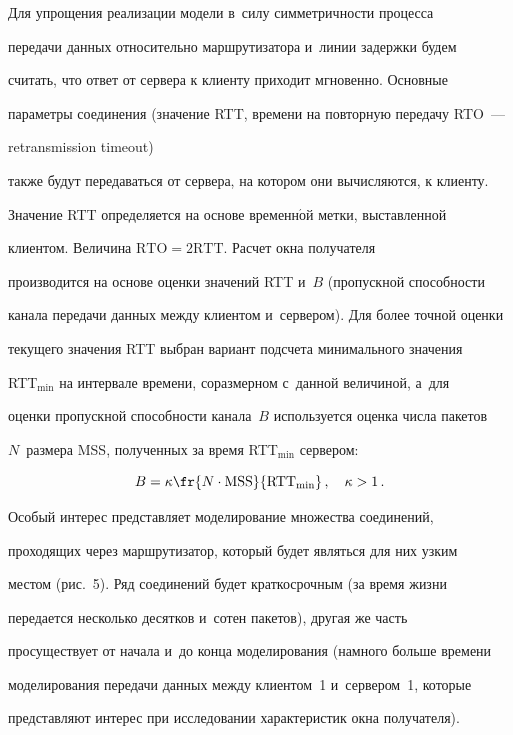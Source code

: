   Для упрощения реализации модели в~силу симметричности процесса


передачи данных относительно маршрутизатора и~линии задержки будем


считать, что ответ от сервера к клиенту приходит мгновенно. Основные


параметры соединения (значение RTT, времени на повторную передачу RTO~---


retransmission timeout)


также будут передаваться от сервера, на котором они вычисляются, к клиенту.


Значение RTT определяется на основе временн$\acute{\mbox{о}}$й метки, выставленной


клиентом. Величина $\mathrm{RTO} = 2 \mathrm{RTT}$. Расчет окна получателя


производится на основе оценки значений RTT и~$B$ (пропускной способности


канала передачи данных между клиентом и~сервером). Для более точной оценки


текущего значения RTT выбран вариант подсчета минимального значения


RTT$_{\min}$ на интервале времени, соразмерном с~данной величиной, а~для


оценки пропускной способности канала~$B$ используется оценка числа пакетов


$N$~размера MSS, полученных за время RTT$_{\min}$ сервером:


  $$


  B=\kappa\fr{N \cdot \mathrm{MSS}}{\mathrm{RTT}_{\min}}\,,\quad \kappa>1\,.


  $$





  Особый интерес представляет моделирование множества соединений,


проходящих через маршрутизатор, который будет являться для них узким


местом (рис.~5). Ряд соединений будет краткосрочным (за время жизни


передается несколько десятков и~сотен пакетов), другая же часть


просуществует от начала и~до конца моделирования (намного больше времени


моделирования передачи данных между клиентом~1 и~сервером~1, которые


представляют интерес при исследовании характеристик окна получателя).


